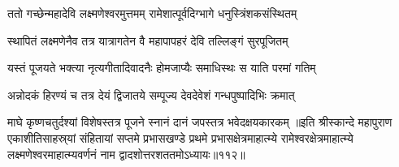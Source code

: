 
\vakta{}
\shrota{}
\tags{}
\notes{}

\storymeta





\twolineshloka
{ततो गच्छेन्महादेवि लक्ष्मणेश्वरमुत्तमम्}
{रामेशात्पूर्वदिग्भागे धनुस्त्रिंशकसंस्थितम्}%

\twolineshloka
{स्थापितं लक्ष्मणेनैव तत्र यात्रागतेन वै}
{महापापहरं देवि तल्लिङ्गं सुरपूजितम्}%

\twolineshloka
{यस्तं पूजयते भक्त्या नृत्यगीतादिवादनैः}
{होमजाप्यैः समाधिस्थः स याति परमां गतिम्}%

\twolineshloka
{अन्नोदकं हिरण्यं च तत्र देयं द्विजातये}
{सम्पूज्य देवदेवेशं गन्धपुष्पादिभिः क्रमात्}%

\twolineshloka
{माघे कृष्णचतुर्दश्यां विशेषस्तत्र पूजने}
{स्नानं दानं जपस्तत्र भवेदक्षयकारकम्}%
॥इति श्रीस्कान्दे महापुराण एकाशीतिसाहस्र्यां संहितायां सप्तमे प्रभासखण्डे प्रथमे प्रभासक्षेत्रमाहात्म्ये रामेश्वरक्षेत्रमाहात्म्ये लक्ष्मणेश्वरमाहात्म्यवर्णनं नाम द्वादशोत्तरशततमोऽध्यायः॥११२॥